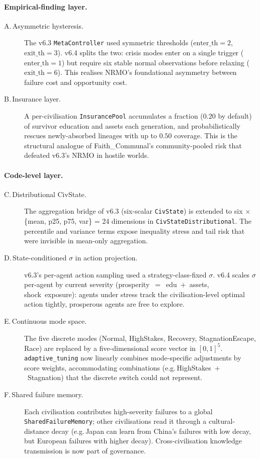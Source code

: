 \paragraph{Empirical-finding layer.}
\begin{description}
\item[A.\,Asymmetric hysteresis.]
The v6.3 \texttt{MetaController} used symmetric thresholds
($\mathrm{enter\_th}{=}2$, $\mathrm{exit\_th}{=}3$). v6.4 splits the
two: crisis modes enter on a single trigger
($\mathrm{enter\_th}{=}1$) but require six stable normal observations
before relaxing ($\mathrm{exit\_th}{=}6$). This realises NRMO's
foundational asymmetry between failure cost and opportunity cost.

\item[B.\,Insurance layer.]
A per-civilisation \texttt{InsurancePool} accumulates a fraction
($0.20$ by default) of survivor education and assets each generation,
and probabilistically rescues newly-absorbed lineages with up to
$0.50$ coverage. This is the structural analogue of Faith\_Communal's
community-pooled risk that defeated v6.3's NRMO in hostile worlds.
\end{description}

\paragraph{Code-level layer.}
\begin{description}
\item[C.\,Distributional CivState.]
The aggregation bridge of v6.3 (six-scalar \texttt{CivState}) is
extended to six $\times$ \{mean, p25, p75, var\} = 24 dimensions in
\texttt{CivStateDistributional}. The percentile and variance terms
expose inequality stress and tail risk that were invisible in
mean-only aggregation.

\item[D.\,State-conditioned $\sigma$ in action projection.]
v6.3's per-agent action sampling used a strategy-class-fixed
$\sigma$. v6.4 scales $\sigma$ per-agent by current severity
(prosperity~$=$~edu~$+$~assets, shock~exposure): agents under stress
track the civilisation-level optimal action tightly, prosperous
agents are free to explore.

\item[E.\,Continuous mode space.]
The five discrete modes (Normal, HighStakes, Recovery,
StagnationEscape, Race) are replaced by a five-dimensional
score vector in $[0,1]^5$. \texttt{adaptive\_tuning} now linearly
combines mode-specific adjustments by score weights, accommodating
combinations (e.g.\,HighStakes~$+$~Stagnation) that the discrete
switch could not represent.

\item[F.\,Shared failure memory.]
Each civilisation contributes high-severity failures to a global
\texttt{Shared\-Failure\-Memory}; other civilisations read it through a
cultural-distance decay (e.g.\,Japan can learn from China's
failures with low decay, but European failures with higher decay).
Cross-civilisation knowledge transmission is now part of governance.
\end{description}

